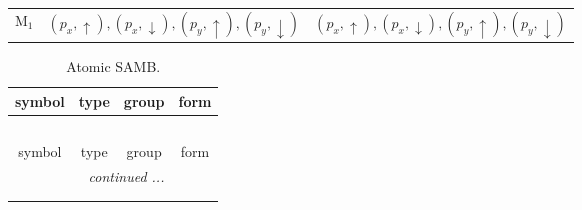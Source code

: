 \documentclass[fleqn,10pt,landscape]{article}
\begin{document}
\begin{itemize}
\begin{center}
\begin{longtable}{c|c|c}
M$_{1}$ & $(p_{x},\uparrow), (p_{x},\downarrow), (p_{y},\uparrow), (p_{y},\downarrow)$ & $(p_{x},\uparrow), (p_{x},\downarrow), (p_{y},\uparrow), (p_{y},\downarrow)$ \\
\end{longtable}
\end{center}
\begin{center}
\renewcommand{\arraystretch}{1.3}
\begin{longtable}{c|c|c|c}
\caption{Atomic SAMB.}
 \\
 \hline \hline
symbol & type & group & form \\ \hline \endfirsthead

\multicolumn{3}{l}{\tablename\ \thetable{}} \\
 \hline \hline
symbol & type & group & form \\ \hline \endhead

 \hline \hline
\multicolumn{3}{r}{\footnotesize\it continued ...} \\ \endfoot

 \hline \hline
\multicolumn{3}{r}{} \\ \endlastfoot


\end{longtable}
\end{center}
\end{itemize}
\end{document}
